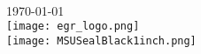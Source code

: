 \begin{titlepage}
\begin{minipage}[t]{0.3\textwidth}
\begin{flushright}
			\end{flushright}
			
		\end{minipage}\\[2cm]
		
		
		
		{\large \today}\\[2cm] %
		
		
		\texttt{[image: egr\_logo.png]}\\[1cm]  %
		
		\texttt{[image: MSUSealBlack1inch.png]}
		\\[1cm] 
		
		\vfill %
		
\end{titlepage}
